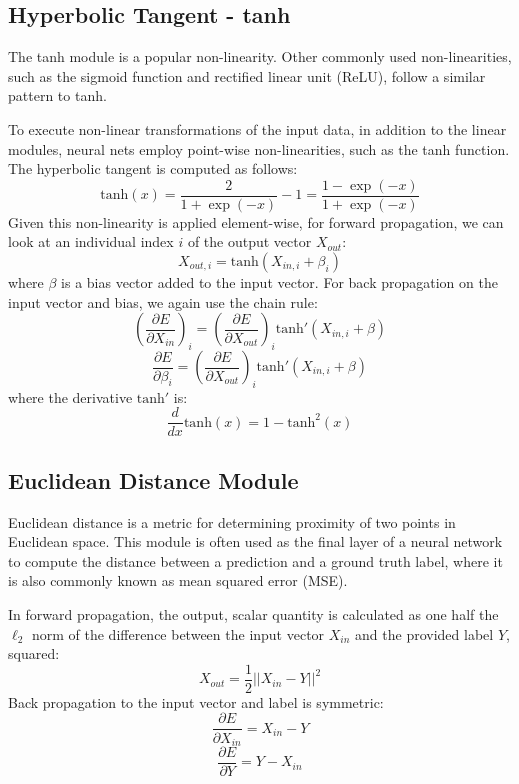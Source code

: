 \subsection{Hyperbolic Tangent - tanh}

The tanh module is a popular non-linearity. Other commonly used non-linearities, such as the sigmoid function and rectified linear unit (ReLU), follow a similar pattern to tanh.

To execute non-linear transformations of the input data, in addition to the linear modules, neural nets employ point-wise non-linearities, such as the tanh function.
The hyperbolic tangent is computed as follows: $$\mathrm{tanh}(x) = \frac{2}{1 + \exp(-x)} - 1 = \frac{1 - \exp(-x)}{1 + \exp(-x)}$$ Given this non-linearity is applied element-wise, for forward propagation, we can look at an individual index $i$ of the output vector $X_{out}$: $$X_{out, i} = \mathrm{tanh}(X_{in, i} + \beta_i)$$ where $\beta$ is a bias vector added to the input vector.
For back propagation on the input vector and bias, we again use the chain rule: $$\left(\frac{\partial E}{\partial X_{in}}\right)_{i} = \left(\frac{\partial E}{\partial X_{out}}\right)_{i}\mathrm{tanh}'(X_{in, i} + \beta)$$ $$\frac{\partial E}{\partial \beta_i} = \left(\frac{\partial E}{\partial X_{out}}\right)_{i}\mathrm{tanh}'(X_{in, i} + \beta)$$ where the derivative $\mathrm{tanh}'$ is: $$\frac{d}{dx}\mathrm{tanh}(x) = 1 - \mathrm{tanh}^2(x)$$

\subsection{Euclidean Distance Module}

Euclidean distance is a metric for determining proximity of two points in Euclidean space.
This module is often used as the final layer of a neural network to compute the distance between a prediction and a ground truth label, where it is also commonly known as mean squared error (MSE).

In forward propagation, the output, scalar quantity is calculated as one half the $\ell_2$ norm of the difference between the input vector $X_{in}$ and the provided label $Y$, squared: $$X_{out} = \frac{1}{2}||X_{in} - Y||^2$$ Back propagation to the input vector and label is symmetric: $$\frac{\partial E}{\partial X_{in}} = X_{in} - Y$$ $$\frac{\partial E}{\partial Y} = Y - X_{in}$$


